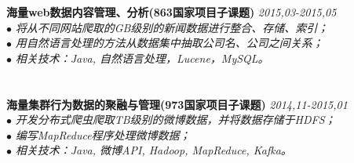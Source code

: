 \documentclass{resume}
\newcommand\fs{\CJKfamily{fs}}
\newcommand{\sanhao}{\fontsize{16pt}{\baselineskip}\selectfont}
\newcommand{\sihao}{\fontsize{14pt}{\baselineskip}\selectfont}
\begin{document}
\begin{rSection}{\fs \sanhao {项目经历}}
\sihao \textbf {    海量web数据内容管理、分析(863国家项目子课题)} \hfill {\em 2015,03-2015,05}\\
$\bullet$ \textit{   将从不同网站爬取的GB级别的新闻数据进行整合、存储、索引；}\\
$\bullet$ \textit{   用自然语言处理的方法从数据集中抽取公司名、公司之间关系；}\\
$\bullet$ \textit{   相关技术：Java, 自然语言处理，Lucene，MySQL。}\\
\\
\\
\sihao \textbf {海量集群行为数据的聚融与管理(973国家项目子课题)} \hfill {\em 2014,11-2015,01}\\
$\bullet$ \textit{  开发分布式爬虫爬取TB级别的微博数据，并将数据存储于HDFS；}\\
$\bullet$ \textit{  编写MapReduce程序处理微博数据；}\\
$\bullet$ \textit{  相关技术：Java, 微博API, Hadoop, MapReduce, Kafka。}\\
\\

\end{rSection}
\end{document}
